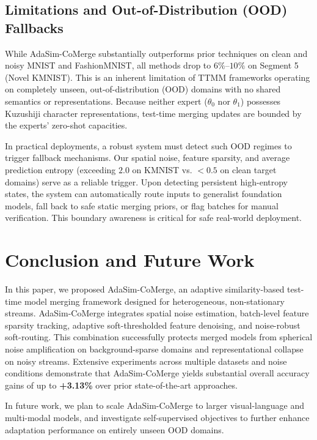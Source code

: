 \documentclass{article}
\theoremstyle{plain}
\theoremstyle{definition}
\theoremstyle{remark}
\begin{document}
\subsection{Limitations and Out-of-Distribution (OOD) Fallbacks}
While AdaSim-CoMerge substantially outperforms prior techniques on clean and noisy MNIST and FashionMNIST, all methods drop to $6\%$--$10\%$ on Segment 5 (Novel KMNIST). This is an inherent limitation of TTMM frameworks operating on completely unseen, out-of-distribution (OOD) domains with no shared semantics or representations. Because neither expert ($\theta_0$ nor $\theta_1$) possesses Kuzushiji character representations, test-time merging updates are bounded by the experts' zero-shot capacities. 

In practical deployments, a robust system must detect such OOD regimes to trigger fallback mechanisms. Our spatial noise, feature sparsity, and average prediction entropy (exceeding $2.0$ on KMNIST vs. $<0.5$ on clean target domains) serve as a reliable trigger. Upon detecting persistent high-entropy states, the system can automatically route inputs to generalist foundation models, fall back to safe static merging priors, or flag batches for manual verification. This boundary awareness is critical for safe real-world deployment.

\section{Conclusion and Future Work}
\label{sec:conclusion}

In this paper, we proposed AdaSim-CoMerge, an adaptive similarity-based test-time model merging framework designed for heterogeneous, non-stationary streams. AdaSim-CoMerge integrates spatial noise estimation, batch-level feature sparsity tracking, adaptive soft-thresholded feature denoising, and noise-robust soft-routing. This combination successfully protects merged models from spherical noise amplification on background-sparse domains and representational collapse on noisy streams. Extensive experiments across multiple datasets and noise conditions demonstrate that AdaSim-CoMerge yields substantial overall accuracy gains of up to \textbf{+3.13\%} over prior state-of-the-art approaches.

In future work, we plan to scale AdaSim-CoMerge to larger visual-language and multi-modal models, and investigate self-supervised objectives to further enhance adaptation performance on entirely unseen OOD domains.
\end{document}
